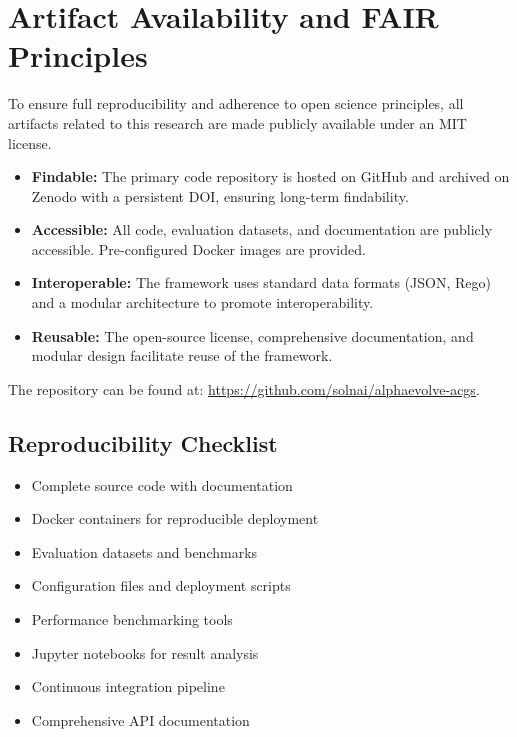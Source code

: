 \documentclass[10pt,twocolumn]{article}
\newcommand{\checkmarkcustom}{\ding{51}}
\theoremstyle{definition}
\begin{document}
\section{Artifact Availability and FAIR Principles}
\label{sec:appendix_artifacts}
To ensure full reproducibility and adherence to open science principles, all artifacts related to this research are made publicly available under an MIT license.

\begin{itemize}[leftmargin=*,topsep=0pt,itemsep=2pt,parsep=0pt]
    \item \textbf{Findable:} The primary code repository is hosted on GitHub and archived on Zenodo with a persistent DOI, ensuring long-term findability.
    \item \textbf{Accessible:} All code, evaluation datasets, and documentation are publicly accessible. Pre-configured Docker images are provided.
    \item \textbf{Interoperable:} The framework uses standard data formats (JSON, Rego) and a modular architecture to promote interoperability.
    \item \textbf{Reusable:} The open-source license, comprehensive documentation, and modular design facilitate reuse of the framework.
\end{itemize}

The repository can be found at: \url{https://github.com/solnai/alphaevolve-acgs}.

\subsection{Reproducibility Checklist}
\begin{itemize}[leftmargin=*,topsep=0pt,itemsep=2pt,parsep=0pt]
    \item[\checkmarkcustom] Complete source code with documentation
    \item[\checkmarkcustom] Docker containers for reproducible deployment
    \item[\checkmarkcustom] Evaluation datasets and benchmarks
    \item[\checkmarkcustom] Configuration files and deployment scripts
    \item[\checkmarkcustom] Performance benchmarking tools
    \item[\checkmarkcustom] Jupyter notebooks for result analysis
    \item[\checkmarkcustom] Continuous integration pipeline
    \item[\checkmarkcustom] Comprehensive API documentation
\end{itemize}
\end{document}
